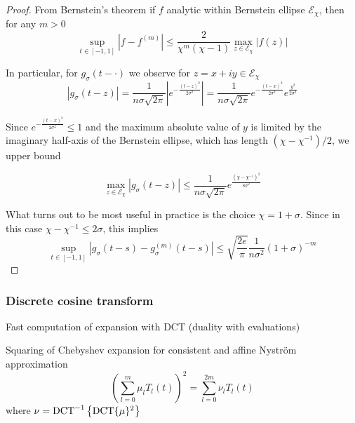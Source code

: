 \documentclass[12pt]{article}
\begin{document}
\begin{proof}
From Bernstein's theorem \cite[Theorem 4.3]{trefethen-2008-gauss-quadrature} if $f$ analytic within Bernstein ellipse $\mathcal{E}_{\chi}$, then for any $m > 0$
\begin{equation}
    \sup_{t \in [-1, 1]} \left| f - f^{(m)} \right| \leq \frac{2}{\chi^m (\chi - 1)} \max_{z \in \mathcal{E}_{\chi}} |f(z)|
    \label{equ:bernstein-bound}
\end{equation}

In particular, for $g_{\sigma}(t - \cdot)$ we observe for $z = x + iy \in \mathcal{E}_{\chi}$
\begin{equation}
| g_{\sigma}(t - z) | 
= \frac{1}{n \sigma \sqrt{2 \pi}} \left| e^{-\frac{(t - z)^2}{2\sigma^2}} \right|
= \frac{1}{n \sigma \sqrt{2 \pi}} e^{-\frac{(t - x)^2}{2\sigma^2}}e^{\frac{y^2}{2\sigma^2}}
\end{equation}

Since $e^{-\frac{(t - x)^2}{2\sigma^2}} \leq 1$ and the maximum absolute value of $y$ is limited by the imaginary half-axis of the Bernstein ellipse, which has length $(\chi - \chi^{-1}) / 2$, we upper bound

\begin{equation}
    \max_{z \in \mathcal{E}_{\chi}} | g_{\sigma}(t - z) | 
    \leq \frac{1}{n \sigma \sqrt{2 \pi}} e^{\frac{(\chi - \chi^{-1})^2}{8 \sigma^2}} 
\end{equation}

What turns out to be most useful in practice is the choice $\chi = 1 + \sigma$. Since in this case $\chi - \chi^{-1} \leq 2\sigma$, this implies
\begin{equation}
    \sup_{t \in [-1, 1]} \left| g_{\sigma}(t - s) - g_{\sigma}^{(m)}(t - s) \right| \leq \sqrt{\frac{2e}{\pi}} \frac{1}{n \sigma^2} (1 + \sigma)^{-m}
\end{equation}
\end{proof}


\subsubsection{Discrete cosine transform}
\label{subsubsec:dct}

Fast computation of expansion with DCT (duality with evaluations)

Squaring of Chebyshev expansion for consistent and affine Nyström approximation
\begin{equation}
    \left( \sum_{l=0}^{m} \mu_l T_l(t) \right)^2 = \sum_{l=0}^{2m} \nu_l T_l(t)
    \label{equ:squared-chebyshev-expansion}
\end{equation}
where $\nu = \operatorname{DCT}^{-1} \left\{ \operatorname{DCT}\{\mu\}^2 \right\}$
\end{document}
